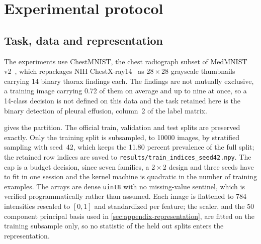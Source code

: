 
\section{Experimental protocol}
\label{sec:protocol}

\subsection{Task, data and representation}
\label{sec:protocol-data}

The experiments use ChestMNIST, the chest radiograph subset of MedMNIST
v2~\cite{yang2023medmnist}, which repackages NIH
ChestX-ray14~\cite{wang2017chestxray8} as \num{28}\,$\times$\,\num{28} grayscale
thumbnails carrying \num{14} binary thorax findings each. The findings are not
mutually exclusive, a training image carrying \num{0.72} of them on average and
up to nine at once, so a \num{14}-class decision is not defined on this data and
the task retained here is the binary detection of pleural effusion, column~2 of
the label matrix.

\begin{table}[t]
  \centering
  \caption{ChestMNIST partition for the effusion target. The splits are those
  distributed by MedMNIST v2; the \num{10000} image training subsample used
  below is drawn from the train row with stratification.}
  \label{tab:dataset}
  \small
  
\end{table}

 gives the partition. The official train, validation and test
splits are preserved exactly. Only the training split is subsampled, to
\num{10000} images, by stratified sampling with seed~\num{42}, which keeps the
\num{11.80} percent prevalence of the full split; the retained row indices are
saved to \texttt{results/train\_indices\_seed42.npy}. The cap is a budget
decision, since seven families, a \num{2}\,$\times$\,\num{2} design and three
seeds have to fit in one session and the kernel machine is quadratic in the
number of training examples. The arrays are dense \texttt{uint8} with no
missing-value sentinel, which is verified programmatically rather than assumed.
Each image is flattened to \num{784} intensities rescaled to $[0,1]$ and
standardized per feature; the scaler, and the \num{50} component principal basis
used in \cref{sec:appendix-representation}, are fitted on the training
subsample only, so no statistic of the held out splits enters the
representation.

